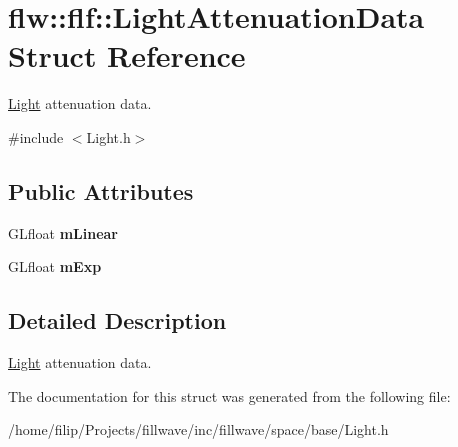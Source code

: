 \hypertarget{structflw_1_1flf_1_1LightAttenuationData}{}\section{flw\+:\+:flf\+:\+:Light\+Attenuation\+Data Struct Reference}
\label{structflw_1_1flf_1_1LightAttenuationData}


\hyperlink{classflw_1_1flf_1_1Light}{Light} attenuation data.  




{\ttfamily \#include $<$Light.\+h$>$}

\subsection*{Public Attributes}
\begin{DoxyCompactItemize}
\item 
G\+Lfloat {\bfseries m\+Linear}\hypertarget{structflw_1_1flf_1_1LightAttenuationData_af36466eb7114528901c5e29268e1a771}{}\label{structflw_1_1flf_1_1LightAttenuationData_af36466eb7114528901c5e29268e1a771}

\item 
G\+Lfloat {\bfseries m\+Exp}\hypertarget{structflw_1_1flf_1_1LightAttenuationData_ac30bbb96fe369514c57d71b282b51708}{}\label{structflw_1_1flf_1_1LightAttenuationData_ac30bbb96fe369514c57d71b282b51708}

\end{DoxyCompactItemize}


\subsection{Detailed Description}
\hyperlink{classflw_1_1flf_1_1Light}{Light} attenuation data. 

The documentation for this struct was generated from the following file\+:\begin{DoxyCompactItemize}
\item 
/home/filip/\+Projects/fillwave/inc/fillwave/space/base/Light.\+h\end{DoxyCompactItemize}
